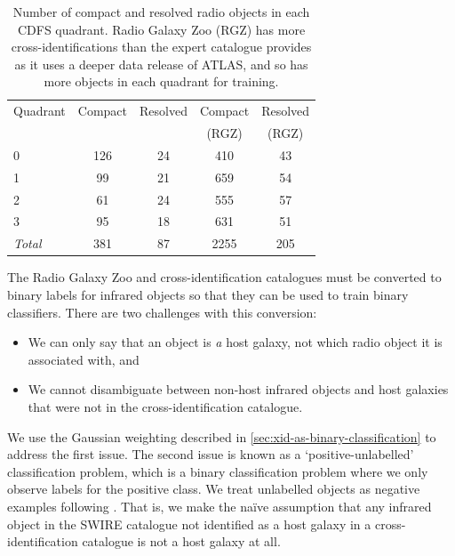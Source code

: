 \documentclass[fleqn,usenatbib,usedcolumn]{mnras}
\newcommand{\edited}[1]{#1}
\begin{document}
    \begin{table}
      \caption{Number of compact and resolved radio objects in each CDFS
      quadrant. Radio Galaxy Zoo (RGZ) has more cross-identifications than the
      expert catalogue \citep{norris06} provides as it uses a deeper data release of ATLAS, and
      so has more objects in each quadrant for training.}
      \label{tab:radio-count}
      \begin{tabular}{lcccc}
        \hline
        Quadrant & Compact & Resolved & Compact & Resolved\\
        &&&(RGZ)&(RGZ)\\
        \hline
        0 & 126 & 24 & 410 & 43 \\
        1 & 99 & 21 & 659 & 54 \\
        2 & 61 & 24 & 555 & 57 \\
        3 & 95 & 18 & 631 & 51 \\
        \hline
        \textit{Total} & 381 & 87 & 2255 & 205\\
        \hline
      \end{tabular}
    \end{table}

    \edited{The Radio Galaxy Zoo and \citet{norris06} cross-identification
    catalogues must be converted to binary labels for infrared objects so that
    they can be used to train binary classifiers. There are two challenges with this conversion:
    \begin{itemize}
      \item We can only say that an object is \emph{a} host galaxy, not which radio object it is associated with, and
      \item We cannot disambiguate between non-host infrared objects and host galaxies that were not in the cross-identification catalogue.
    \end{itemize}
    
    We use the Gaussian weighting described in \autoref{sec:xid-as-binary-classification} to address the first issue.
    The second issue is known as a `positive-unlabelled' classification problem, which is
    a binary classification problem where we only observe labels for the
    positive class. We treat unlabelled objects as negative examples following
    \citet{menon15cpe}. That is, we make the na\"ive assumption that any
    infrared object in the SWIRE catalogue not identified as a host galaxy in a cross-identification catalogue is not a host galaxy at all.}
\end{document}
